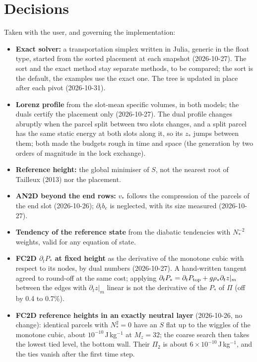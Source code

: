 \documentclass[11pt,a4paper]{article}
\newcommand{\Ptop}{P_{\rm top}}
\newcommand{\zs}{z_{*}}
\begin{document}
\section{Decisions}\label{sec:decisions}
Taken with the user, and governing the implementation:
\begin{itemize}
  \item \textbf{Exact solver:} a transportation simplex written in Julia, generic in the float type, started from the sorted
        placement at each snapshot (2026-10-27). The sort and the exact method stay separate methods, to be compared; the sort
        is the default, the examples use the exact one. The tree is updated in place after each pivot (2026-10-31).
  \item \textbf{Lorenz profile} from the slot-mean specific volumes, in both models; the duals certify the placement only
        (2026-10-27). The dual profile changes abruptly when the parcel split between two slots changes, and a split parcel has
        the same static energy at both slots along it, so its $\zs$ jumps between them; both made the budgets rough in time
        and space (the generation by two orders of magnitude in the lock exchange).
  \item \textbf{Reference height:} the global minimiser of $S$, not the nearest root of Tailleux (2013) nor the placement.
  \item \textbf{AN2D beyond the end rows:} $v_*$ follows the compression of the parcels of the end slot (2026-10-26);
        $\partial_tb_e$ is neglected, with its size measured (2026-10-27).
  \item \textbf{Tendency of the reference state} from the diabatic tendencies with $N_*^{-2}$ weights, valid for any equation of
        state.
  \item \textbf{FC2D $\partial_tP_*$ at fixed height} as the derivative of the monotone cubic with respect to its nodes, by dual
        numbers (2026-10-27). A hand-written tangent agreed to round-off at the same cost; applying
        $\partial_tP_*=\partial_t\Ptop+g\rho_*\partial_tz|_m$ between the edges with $\partial_tz|_m$ linear is not the derivative of
        the $P_*$ of $\Pi$ (off by 0.4 to 0.7\%).
  \item \textbf{FC2D reference heights in an exactly neutral layer} (2026-10-26, no change): identical parcels with $N_*^2=0$
        have an $S$ flat up to the wiggles of the monotone cubic, about $10^{-10}$\,J\,kg$^{-1}$ at $M_z=32$; the coarse search
        then takes the lowest tied level, the bottom wall. Their $\Pi_2$ is about $6\times10^{-10}$\,J\,kg$^{-1}$, and the ties
        vanish after the first time step.
\end{itemize}
\end{document}
